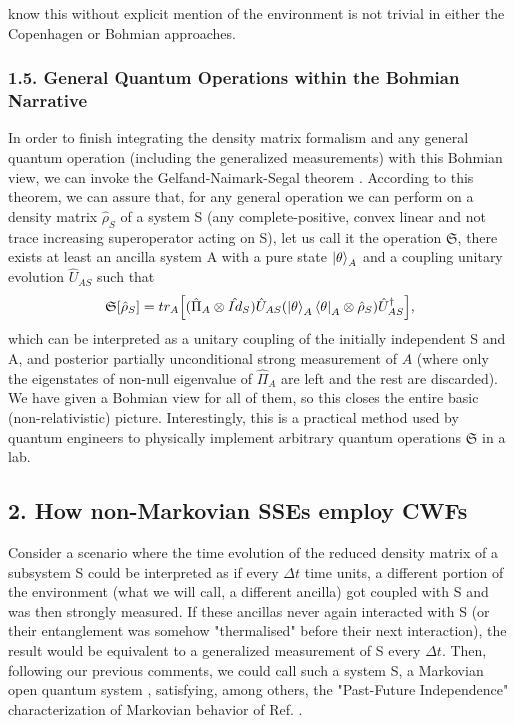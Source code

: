 \documentclass[11pt, a4paper]{article} %
\begin{document}
know this without explicit mention of the environment is not trivial in either the Copenhagen or Bohmian approaches.\vspace{-0.25cm}

\subsubsection*{1.5. General Quantum Operations within the Bohmian Narrative}\vspace{-0.2cm}

In order to finish integrating the density matrix formalism and any general quantum operation (including the generalized measurements) with this Bohmian view, we can invoke the Gelfand-Naimark-Segal theorem \cite{GNSTheorem, Generalized}. According to this theorem, we can assure that, for any general operation we can perform on a density matrix $\hat{\rho}_S$ of a system S (any complete-positive, convex linear and not trace increasing superoperator acting on S), let us call it the operation $\mathfrak{S}$, there exists at least an ancilla system A with a pure state $\ket{\theta}_A$ and a coupling unitary evolution $\hat{U}_{AS}$ such that\vspace{-0.15cm}
\begin{equation}
\mathfrak{S}[\hat{\rho}_S]=tr_A\qty[ (\hat{\Pi}_A\otimes \hat{Id}_S)  \hat{U}_{AS}\qty(\ket{\theta}_A\bra{\theta}_A\otimes \hat{\rho}_S)\hat{U}_{AS}^\dagger],
\end{equation}
which can be interpreted as a unitary coupling of the initially independent S and A, and posterior partially unconditional strong measurement of $A$ (where only the eigenstates of non-null eigenvalue of $\hat{\Pi}_A$ are left and the rest are discarded). We have given a Bohmian view for all of them, so this closes the entire basic (non-relativistic) picture. Interestingly, this is a practical method used by quantum engineers to physically implement arbitrary quantum operations $\mathfrak{S}$ in a lab.\vspace{-0.2cm}


\subsection*{2. How non-Markovian SSEs employ CWFs}
Consider a scenario where the time evolution of the reduced density matrix of a subsystem S could be interpreted as if every $\Delta t$ time units, a different portion of the environment (what we will call, a different ancilla) got coupled with S and was then strongly measured. If these ancillas never again interacted with S (or their entanglement was somehow "thermalised" before their next interaction), the result would be equivalent to a generalized measurement of S every $\Delta t$. Then, following our previous comments, we could call such a system S, a Markovian open quantum system \cite{QuantumTrajs}, satisfying, among others, the "Past-Future Independence" characterization of Markovian behavior of Ref. \cite{MarkovianityDefs}.
\end{document}
